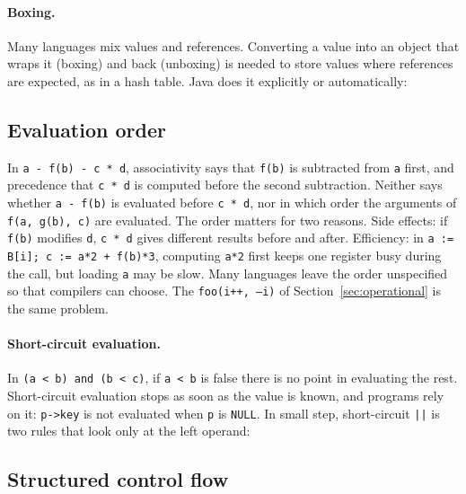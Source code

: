 \paragraph{Boxing.} Many languages mix values and references. Converting a value
into an object that wraps it (boxing) and back (unboxing) is needed to store
values where references are expected, as in a hash table. Java does it
explicitly or automatically:

\subsection{Evaluation order}

In \texttt{a - f(b) - c * d}, associativity says that \texttt{f(b)} is
subtracted from \texttt{a} first, and precedence that \texttt{c * d} is computed
before the second subtraction. Neither says whether \texttt{a - f(b)} is
evaluated before \texttt{c * d}, nor in which order the arguments of
\texttt{f(a, g(b), c)} are evaluated. The order matters for two reasons. Side
effects: if \texttt{f(b)} modifies \texttt{d}, \texttt{c * d} gives different
results before and after. Efficiency: in \texttt{a := B[i]; c := a*2 + f(b)*3},
computing \texttt{a*2} first keeps one register busy during the call, but
loading \texttt{a} may be slow. Many languages leave the order unspecified so
that compilers can choose. The \texttt{foo(i++, --i)} of Section~\ref{sec:operational}
is the same problem.

\paragraph{Short-circuit evaluation.} In \texttt{(a < b) and (b < c)}, if
\texttt{a < b} is false there is no point in evaluating the rest. Short-circuit
evaluation stops as soon as the value is known, and programs rely on it:
\texttt{p->key} is not evaluated when \texttt{p} is \texttt{NULL}. In small step,
short-circuit \texttt{||} is two rules that look only at the left operand:

\subsection{Structured control flow}

